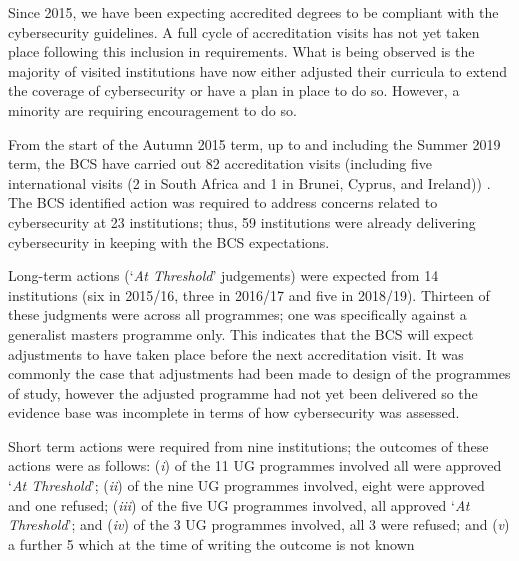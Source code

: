 \documentclass[a4paper,11pt]{article}
\begin{document}
Since 2015, we have been expecting accredited degrees to be compliant with the cybersecurity guidelines. A full cycle of accreditation visits has not yet taken place following this inclusion in requirements. What is being observed is the majority of visited institutions have now either adjusted their curricula to extend the coverage of cybersecurity or have a plan in place to do so. However, a minority are requiring encouragement to do so.

From the start of the Autumn 2015 term, up to and including the Summer 2019 term, the BCS have carried out 82 accreditation visits (including five international visits (2 in South Africa and 1 in Brunei, Cyprus, and Ireland)) . The BCS identified action was required to address concerns related to cybersecurity at 23 institutions; thus, 59 institutions were already delivering cybersecurity in keeping with the BCS expectations.

Long-term actions (`{\emph{At Threshold}}' judgements) were expected from 14 institutions (six in 2015/16, three in 2016/17 and five in 2018/19). Thirteen of these judgments were across all programmes; one was specifically against a generalist masters programme only. This indicates that the BCS will expect adjustments to have taken place before the next accreditation visit. It was commonly the case that adjustments had been made to design of the programmes of study, however the adjusted programme had not yet been delivered so the evidence base was incomplete in terms of how cybersecurity was assessed.
 
Short term actions were required from nine institutions; the outcomes of these actions were as follows: ({\emph{i}}) of the 11 UG programmes involved all were approved `{\emph{At Threshold}}'; ({\emph{ii}}) of the nine UG programmes involved, eight were approved and one refused; ({\emph{iii}}) of the five UG programmes involved, all approved `{\emph{At Threshold}}'; and ({\emph{iv}}) of the 3 UG programmes involved, all 3 were refused; and ({\emph{v}}) a further 5 which at the time of writing the outcome is not known

 
\end{document}

